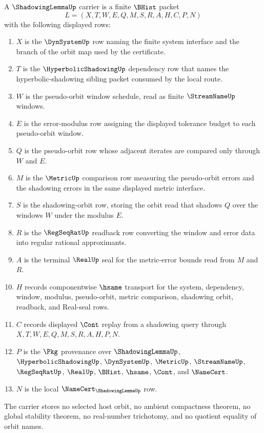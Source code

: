 \begin{definition}
\label{def:shadowing-lemma-carrier}
A $\ShadowingLemmaUp$ carrier is a finite $\BHist$ packet
$$
L=(X,T,W,E,Q,M,S,R,A,H,C,P,N)
$$
with the following displayed rows:
\begin{enumerate}
\item $X$ is the $\DynSystemUp$ row naming the finite system interface and the branch of the orbit map used by the certificate.
\item $T$ is the $\HyperbolicShadowingUp$ dependency row that names the hyperbolic-shadowing sibling packet consumed by the local route.
\item $W$ is the pseudo-orbit window schedule, read as finite $\StreamNameUp$ windows.
\item $E$ is the error-modulus row assigning the displayed tolerance budget to each pseudo-orbit window.
\item $Q$ is the pseudo-orbit row whose adjacent iterates are compared only through $W$ and $E$.
\item $M$ is the $\MetricUp$ comparison row measuring the pseudo-orbit errors and the shadowing errors in the same displayed metric interface.
\item $S$ is the shadowing-orbit row, storing the orbit read that shadows $Q$ over the windows $W$ under the modulus $E$.
\item $R$ is the $\RegSeqRatUp$ readback row converting the window and error data into regular rational approximants.
\item $A$ is the terminal $\RealUp$ seal for the metric-error bounds read from $M$ and $R$.
\item $H$ records componentwise $\hsame$ transport for the system, dependency, window, modulus, pseudo-orbit, metric comparison, shadowing orbit, readback, and Real-seal rows.
\item $C$ records displayed $\Cont$ replay from a shadowing query through $X,T,W,E,Q,M,S,R,A,H,P,N$.
\item $P$ is the $\Pkg$ provenance over $\ShadowingLemmaUp$, $\HyperbolicShadowingUp$, $\DynSystemUp$, $\MetricUp$, $\StreamNameUp$, $\RegSeqRatUp$, $\RealUp$, $\BHist$, $\hsame$, $\Cont$, and $\NameCert$.
\item $N$ is the local $\NameCert_{\ShadowingLemmaUp}$ row.
\end{enumerate}
The carrier stores no selected host orbit, no ambient compactness theorem, no global stability theorem, no real-number trichotomy, and no quotient equality of orbit names.
\end{definition}


